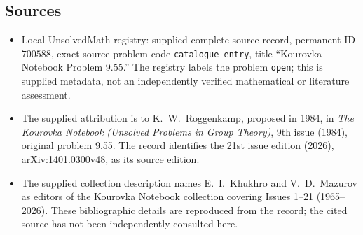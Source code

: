\documentclass[11pt]{article}
\begin{document}
\subsection{Sources}
\begin{itemize}
\item Local UnsolvedMath registry: supplied complete source record, permanent ID \(700588\), exact source problem code \texttt{catalogue entry}, title ``Kourovka Notebook Problem 9.55.'' The registry labels the problem \texttt{open}; this is supplied metadata, not an independently verified mathematical or literature assessment.
\item The supplied attribution is to K.\ W.\ Roggenkamp, proposed in 1984, in \emph{The Kourovka Notebook (Unsolved Problems in Group Theory)}, 9th issue (1984), original problem 9.55. The record identifies the 21st issue edition (2026), arXiv:1401.0300v48, as its source edition.
\item The supplied collection description names E.\ I.\ Khukhro and V.\ D.\ Mazurov as editors of the Kourovka Notebook collection covering Issues 1--21 (1965--2026). These bibliographic details are reproduced from the record; the cited source has not been independently consulted here.
\end{itemize}
\end{document}
